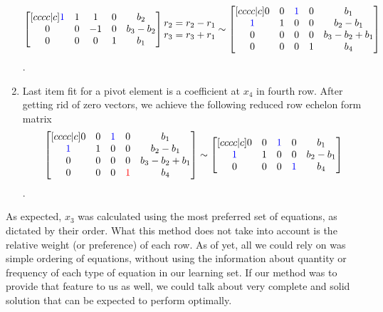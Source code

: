 \begin{enumerate}
\begin{equation}
\begin{bmatrix}[cccc|c]
    \textcolor{blue}{1} & 1 & 1 & 0 & b_2 \\ 
    0 & 0 & -1 & 0 & b_3 - b_2 \\ 
    0 & 0 & 0 & 1 & b_1 \\ 
\end{bmatrix}
\begin{matrix} \\ r_2 = r_2 - r_1 \\ r_3 = r_3 + r_1 \\ \\ \end{matrix} \sim
\begin{bmatrix}[cccc|c]
    0 & 0 & \textcolor{blue}{1} & 0 & b_1 \\ 
    \textcolor{blue}{1} & 1 & 0 & 0 & b_2-b_1 \\ 
    0 & 0 & 0 & 0 & b_3 - b_2 + b_1 \\ 
    0 & 0 & 0 & 1 & b_4
\end{bmatrix}
\end{equation}.
\item Last item fit for a pivot element is a coefficient at $x_4$ in fourth row.
After getting rid of zero vectors, we achieve the following reduced row echelon form matrix
\begin{equation}
\begin{bmatrix}[cccc|c]
    0 & 0 & \textcolor{blue}{1} & 0 & b_1 \\ 
    \textcolor{blue}{1} & 1 & 0 & 0 & b_2-b_1 \\ 
    0 & 0 & 0 & 0 & b_3 - b_2 + b_1 \\ 
    0 & 0 & 0 & \textcolor{red}{1} & b_4
\end{bmatrix}
\sim
\begin{bmatrix}[cccc|c]
    0 & 0 & \textcolor{blue}{1} & 0 & b_1 \\ 
    \textcolor{blue}{1} & 1 & 0 & 0 & b_2-b_1 \\ 
    0 & 0 & 0 & \textcolor{blue}{1} & b_4
\end{bmatrix}
\end{equation}.
\end{enumerate}

As expected, $x_3$ was calculated using the most preferred set of equations, as dictated by their order.
What this method does not take into account is the relative weight (or preference) of each row.
As of yet, all we could rely on was simple ordering of equations, without using the information about quantity or frequency of each type of equation in our learning set.
If our method was to provide that feature to us as well, we could talk about very complete and solid solution that can be expected to perform optimally.

